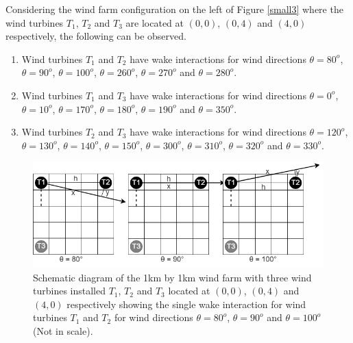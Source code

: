 	Considering the wind farm configuration on the left of Figure \ref{small3} where the wind turbines $T_1$, $T_2$ and $T_3$ are located at $(0,0)$, $(0,4)$ and $(4,0)$ respectively, the following can be observed.
	\begin{enumerate}
		\item Wind turbines $T_1$ and $T_2$ have wake interactions for wind directions $\theta=80^o$, $\theta=90^o$, $\theta=100^o$, $\theta=260^o$, $\theta=270^o$ and $\theta=280^o$.
		\item Wind turbines $T_1$ and $T_3$ have wake interactions for wind directions $\theta=0^o$, $\theta=10^o$, $\theta=170^o$, $\theta=180^o$, $\theta=190^o$ and $\theta=350^o$.
		\item Wind turbines $T_2$ and $T_3$ have wake interactions for wind directions $\theta=120^o$, $\theta=130^o$, $\theta=140^o$, $\theta=150^o$, $\theta=300^o$, $\theta=310^o$, $\theta=320^o$ and $\theta=330^o$.
	\end{enumerate}
	
	\begin{figure}[H]
	    \centering
	    \includegraphics[width=\linewidth]{Figures/schematicsBest3a.png}
	    \caption{Schematic diagram of the 1km by 1km wind farm with three wind turbines installed $T_1$, $T_2$ and $T_3$ located at $(0,0)$, $(0,4)$ and $(4,0)$ respectively showing the single wake interaction for wind turbines $T_1$ and $T_2$ for wind directions $\theta=80^o$, $\theta=90^o$ and $\theta=100^o$ (Not in scale).}
	    \label{schematicsBest3a}
	\end{figure}
	
